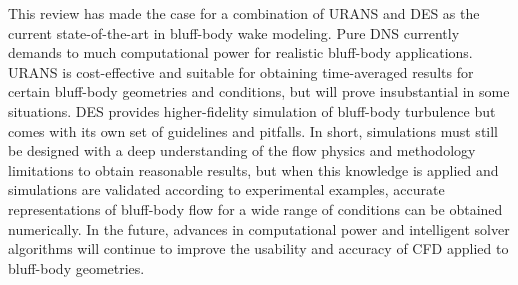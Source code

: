 \documentclass[journal]{new-aiaa}
\begin{document}
This review has made the case for a combination of URANS and DES as the current state-of-the-art in bluff-body wake modeling. Pure DNS currently demands to much computational power for realistic bluff-body applications. URANS is cost-effective and suitable for obtaining time-averaged results for certain bluff-body geometries and conditions, but will prove insubstantial in some situations. DES provides higher-fidelity simulation of bluff-body turbulence but comes with its own set of guidelines and pitfalls. In short, simulations must still be designed with a deep understanding of the flow physics and methodology limitations to obtain reasonable results, but when this knowledge is applied and simulations are validated according to experimental examples, accurate representations of bluff-body flow for a wide range of conditions can be obtained numerically. In the future, advances in computational power and intelligent solver algorithms will continue to improve the usability and accuracy of CFD applied to bluff-body geometries.











\end{document}
